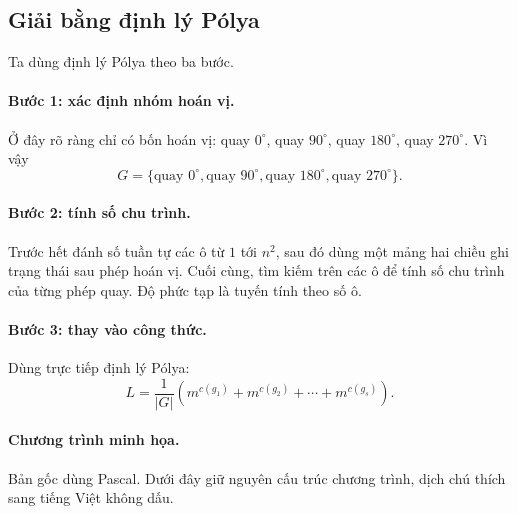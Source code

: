 \documentclass[11pt]{article}
\begin{document}
\subsection{Giải bằng định lý Pólya}

Ta dùng định lý Pólya theo ba bước.

\paragraph{Bước 1: xác định nhóm hoán vị.}
Ở đây rõ ràng chỉ có bốn hoán vị: quay \(0^\circ\), quay \(90^\circ\), quay
\(180^\circ\), quay \(270^\circ\). Vì vậy
\[
  G=\{\text{quay }0^\circ,\text{quay }90^\circ,
       \text{quay }180^\circ,\text{quay }270^\circ\}.
\]

\paragraph{Bước 2: tính số chu trình.}
Trước hết đánh số tuần tự các ô từ \(1\) tới \(n^2\), sau đó dùng một mảng
hai chiều ghi trạng thái sau phép hoán vị. Cuối cùng, tìm kiếm trên các ô để
tính số chu trình của từng phép quay. Độ phức tạp là tuyến tính theo số ô.

\paragraph{Bước 3: thay vào công thức.}
Dùng trực tiếp định lý Pólya:
\[
  L=\frac{1}{|G|}
    \left(m^{c(g_1)}+m^{c(g_2)}+\cdots+m^{c(g_s)}\right).
\]

\paragraph{Chương trình minh họa.}
Bản gốc dùng Pascal. Dưới đây giữ nguyên cấu trúc chương trình, dịch chú
thích sang tiếng Việt không dấu.
\end{document}
